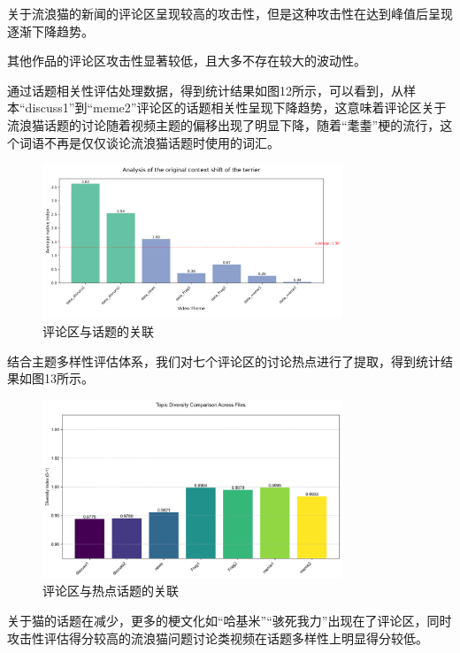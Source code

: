 \documentclass[12pt,a4paper]{ctexart}
\begin{document}
关于流浪猫的新闻的评论区呈现较高的攻击性，但是这种攻击性在达到峰值后呈现逐渐下降趋势。

其他作品的评论区攻击性显著较低，且大多不存在较大的波动性。

通过话题相关性评估处理数据，得到统计结果如图12所示，可以看到，从样本“discuss1”到“meme2”评论区的话题相关性呈现下降趋势，这意味着评论区关于流浪猫话题的讨论随着视频主题的偏移出现了明显下降，随着“耄耋”梗的流行，这个词语不再是仅仅谈论流浪猫话题时使用的词汇。

\begin{figure}[htbp]
    \centering
    \includegraphics[width=0.8\textwidth]{img/comment_area_vs_topic.png}
    \caption{评论区与话题的关联}
    \label{fig:comment_area_vs_topic}
\end{figure}

结合主题多样性评估体系，我们对七个评论区的讨论热点进行了提取，得到统计结果如图13所示。

\begin{figure}[htbp]
    \centering
    \includegraphics[width=0.8\textwidth]{img/comment_area_vs_hot_topic.png}
    \caption{评论区与热点话题的关联}
    \label{fig:comment_area_vs_hot_topic}
\end{figure}

关于猫的话题在减少，更多的梗文化如“哈基米”“骇死我力”出现在了评论区，同时攻击性评估得分较高的流浪猫问题讨论类视频在话题多样性上明显得分较低。
\end{document}
